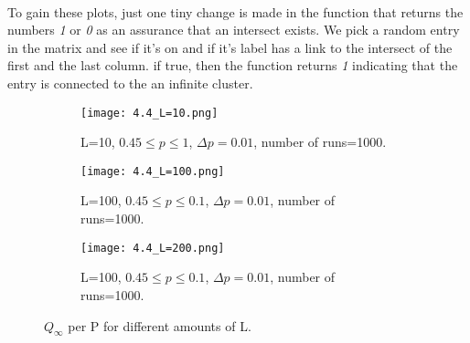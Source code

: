 \documentclass[12pt]{article}
\begin{document}
\paragraph*{} To gain these plots, just one tiny change is made in the function that returns the numbers \textit{1} or \textit{0} as an assurance that an intersect exists. We pick a random entry in the matrix and see if it's on and if it's label has a link to the intersect of the first and the last column. if true, then the function returns \textit{1} indicating that the entry is connected to the an infinite cluster. 
\begin{figure}[H]
	\begin{subfigure}[t]{0.45\textwidth}
		\centering
		\texttt{[image: 4.4\_L=10.png]}
		\label{fig:mesh7.1}
		\caption{L=10, $0.45 \leq p \leq 1$, $\Delta p=0.01$, number of runs=1000.}
	\end{subfigure}\hfill
	\begin{subfigure}[t]{0.45\textwidth}
		\centering
		\texttt{[image: 4.4\_L=100.png]}
		\label{fig:mesh7.2}
		\caption{L=100, $0.45 \leq p \leq 0.1$, $\Delta p=0.01$, number of runs=1000.}
	\end{subfigure}\hfill
	\begin{subfigure}[t]{0.45\textwidth}
		\centering
		\texttt{[image: 4.4\_L=200.png]}
		\label{fig:mesh7.3}
		\caption{L=100, $0.45 \leq p \leq 0.1$, $\Delta p=0.01$, number of runs=1000.}
	\end{subfigure}
	\centering
	\label{fig:mesh7}
	\caption{$Q_{\infty}$ per P for different amounts of L. }
\end{figure}
\end{document}
